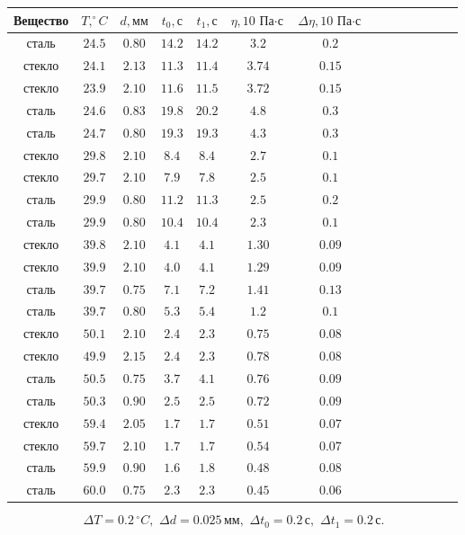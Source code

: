 \begin{center}
\begin{tabular}{|c|c|c|c|c|c|c|c|c|c|c|c|c|c|}\hline
Вещество&$T, ^\circ C$&$d, \text{мм}$&$t_0, \text{с}$&$t_1, \text{с}$&$\eta, 10\,\text{Па$\cdot$с}$&$\Delta \eta, 10\,\text{Па$\cdot$с}$
\\ \hline
сталь&$24.5$&$0.80$&$14.2$&$14.2$&$3.2$&$0.2$\\ \hline
стекло&$24.1$&$2.13$&$11.3$&$11.4$&$3.74$&$0.15$\\ \hline
стекло&$23.9$&$2.10$&$11.6$&$11.5$&$3.72$&$0.15$\\ \hline
сталь&$24.6$&$0.83$&$19.8$&$20.2$&$4.8$&$0.3$\\ \hline
сталь&$24.7$&$0.80$&$19.3$&$19.3$&$4.3$&$0.3$\\ \hline
стекло&$29.8$&$2.10$&$8.4$&$8.4$&$2.7$&$0.1$\\ \hline
стекло&$29.7$&$2.10$&$7.9$&$7.8$&$2.5$&$0.1$\\ \hline
сталь&$29.9$&$0.80$&$11.2$&$11.3$&$2.5$&$0.2$\\ \hline
сталь&$29.9$&$0.80$&$10.4$&$10.4$&$2.3$&$0.1$\\ \hline
стекло&$39.8$&$2.10$&$4.1$&$4.1$&$1.30$&$0.09$\\ \hline
стекло&$39.9$&$2.10$&$4.0$&$4.1$&$1.29$&$0.09$\\ \hline
сталь&$39.7$&$0.75$&$7.1$&$7.2$&$1.41$&$0.13$\\ \hline
сталь&$39.7$&$0.80$&$5.3$&$5.4$&$1.2$&$0.1$\\ \hline
стекло&$50.1$&$2.10$&$2.4$&$2.3$&$0.75$&$0.08$\\ \hline
стекло&$49.9$&$2.15$&$2.4$&$2.3$&$0.78$&$0.08$\\ \hline
сталь&$50.5$&$0.75$&$3.7$&$4.1$&$0.76$&$0.09$\\ \hline
сталь&$50.3$&$0.90$&$2.5$&$2.5$&$0.72$&$0.09$\\ \hline
стекло&$59.4$&$2.05$&$1.7$&$1.7$&$0.51$&$0.07$\\ \hline
стекло&$59.7$&$2.10$&$1.7$&$1.7$&$0.54$&$0.07$\\ \hline
сталь&$59.9$&$0.90$&$1.6$&$1.8$&$0.48$&$0.08$\\ \hline
сталь&$60.0$&$0.75$&$2.3$&$2.3$&$0.45$&$0.06$\\ \hline
\end{tabular}
\end{center}
$$\Delta T=0.2\, ^\circ C,\,\,\Delta d=0.025\, \text{мм},\,\,\Delta t_0=0.2\, \text{с},\,\,\Delta t_1=0.2\, \text{с}.$$

